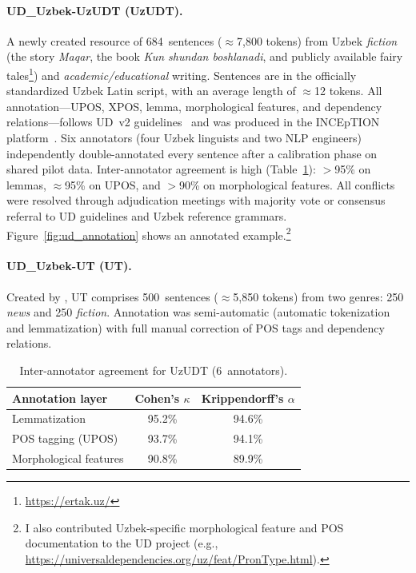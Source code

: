 \documentclass[runningheads]{llncs}
\begin{document}
\paragraph{UD\_Uzbek-UzUDT (UzUDT).}
A newly created resource of 684~sentences (${\approx}$7{,}800 tokens) from Uzbek \emph{fiction} (the story \textit{Maqar}, the book \textit{Kun shundan boshlanadi}, and publicly available fairy tales\footnote{\url{https://ertak.uz/}}) and \emph{academic/educational} writing.
Sentences are in the officially standardized Uzbek Latin script, with an average length of ${\approx}$12 tokens.
All annotation---UPOS, XPOS, lemma, morphological features, and dependency relations---follows UD~v2 guidelines~\cite{de-marneffe-etal-2021-universal} and was produced in the INCEpTION platform~\cite{klie-etal-2018-inception}.
Six annotators (four Uzbek linguists and two NLP engineers) independently double-annotated every sentence after a calibration phase on shared pilot data.
Inter-annotator agreement is high (Table~\ref{tab:inter-annotator}): $>$95\% on lemmas, ${\approx}$95\% on UPOS, and $>$90\% on morphological features.
All conflicts were resolved through adjudication meetings with majority vote or consensus referral to UD guidelines and Uzbek reference grammars.
Figure~\ref{fig:ud_annotation} shows an annotated example.\footnote{I also contributed Uzbek-specific morphological feature and POS documentation to the UD project (e.g., \url{https://universaldependencies.org/uz/feat/PronType.html}).}

\paragraph{UD\_Uzbek-UT (UT).}
Created by \cite{akhundjanova-talamo-2025-universal}, UT comprises 500~sentences (${\approx}$5{,}850 tokens) from two genres: 250 \emph{news} and 250 \emph{fiction}.
Annotation was semi-automatic (automatic tokenization and lemmatization) with full manual correction of POS tags and dependency relations.

\begin{table}[t]
\centering
\small
\caption{Inter-annotator agreement for UzUDT (6~annotators).}
\label{tab:inter-annotator}
\begin{tabular}{lcc}
\toprule
\textbf{Annotation layer} & \textbf{Cohen's $\kappa$} & \textbf{Krippendorff's $\alpha$} \\
\midrule
Lemmatization          & 95.2\% & 94.6\% \\
POS tagging (UPOS)     & 93.7\% & 94.1\% \\
Morphological features & 90.8\% & 89.9\% \\
\bottomrule
\end{tabular}
\end{table}
\end{document}
